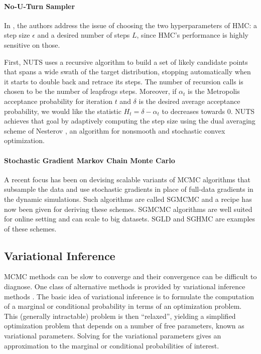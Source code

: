 \paragraph{No-U-Turn Sampler}
In \cite{NUTS}, the authors address the issue of choosing the two hyperparameters of \gls{HMC}: a step size $\epsilon$ and a desired number of steps $L$, since \gls{HMC}'s performance is highly sensitive on those.

First, \gls{NUTS} uses a recursive algorithm to build a set of likely candidate points that spans a wide swath of the target distribution, stopping automatically when it starts to double back and retrace its steps. The number of recursion calls is chosen to be the number of leapfrogs steps.
Moreover, if $\alpha_t$ is the Metropolis acceptance probability for iteration $t$ and $\delta$ is the desired average acceptance probability, we would like the statistic $H_t = \delta - \alpha_t$ to decreases towards $0$.
\gls{NUTS} achieves that goal by adaptively computing the step size using the dual averaging scheme of Nesterov \cite{Nesterov2009}, an algorithm for nonsmooth and stochastic convex optimization.

\paragraph{Stochastic Gradient Markov Chain Monte Carlo}
A recent focus has been on devising scalable variants of \gls{MCMC} algorithms that subsample the data and use stochastic gradients in place of full-data gradients in the dynamic simulations. Such algorithms are called \gls{SGMCMC} and a recipe has now been given \cite{SGMCMC} for deriving these schemes. \gls{SGMCMC} algorithms are well suited for online setting and can scale to big datasets.
\gls{SGLD} \cite{SGLD} and \gls{SGHMC} \cite{SGHMC} are examples of these schemes.
 
 

\subsection{Variational Inference}

MCMC methods can be slow to converge and their convergence can be difficult to diagnose.
One class of alternative methods is provided by variational inference methods \cite{Jordan:1998ci,Ghahramani:2000:PAV:3008751.3008822}.
The basic idea of variational inference is to formulate the computation of a marginal
or conditional probability in terms of an optimization problem.
This (generally intractable) problem is then ``relaxed'', yielding a simplified optimization problem that
depends on a number of free parameters, known as variational parameters. Solving for the variational parameters gives an approximation to the marginal or conditional probabilities of interest.

